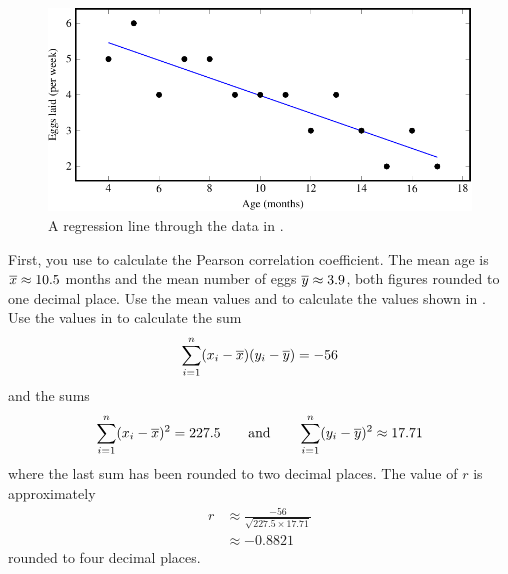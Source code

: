 \documentclass[a4paper,oneside,12pt]{article}
\begin{document}
\begin{problem}
{\begin{solution}
\begin{table}[!htbp]
\centering

\caption{%
  Detailed calculation of the regression line for the data in
  .  Note that most numbers have been rounded to
  six decimal places in order to fit the table.  You should only do
  the rounding for the final results.  Except for the first two
  columns, the numbers in the table should be computed by using a
  spreadsheet software package.
}
\label{tab:age_egg_regression}
\end{table}

\begin{figure}[!htbp]
\centering
\includegraphics[scale=1]{image/07/age-eggs-regression.pdf}
\caption{%
  A regression line through the data in .
}
\label{fig:age_eggs_regression}
\end{figure}

First, you use  to
calculate the Pearson correlation coefficient.  The mean age is
$\overline{x} \approx 10.5$ months and the mean number of eggs
$\overline{y} \approx 3.9$, both figures rounded to one decimal place.  Use
the mean values and 
to calculate the values shown in .  Use the
values in  to calculate the sum
\[
\sum_{i=1}^n (x_i - \overline{x}) (y_i - \overline{y})
=
-56
\]
and the sums
\[
\sum_{i=1}^n (x_i - \overline{x})^2
=
227.5
\qquad
\text{and}
\qquad
\sum_{i=1}^n (y_i - \overline{y})^2
\approx
17.71
\]
where the last sum has been rounded to two decimal places.  The value
of $r$ is approximately
\begin{align*}
r
&\approx
\frac{
  -56
}{
  \sqrt{
    227.5 \times 17.71
  }
} \\[4pt]
&\approx
-0.8821
\end{align*}
rounded to four decimal places.


\end{solution}}
\end{problem}
\end{document}
